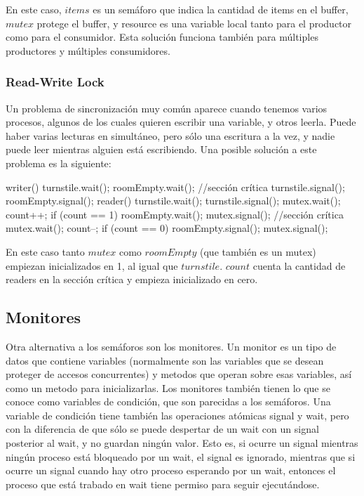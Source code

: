 \documentclass{article}
\begin{document}
En este caso, $items$ es un sem\'aforo que indica la cantidad de items en el buffer, $mutex$ protege el buffer, y resource es una variable local tanto para el productor como para el consumidor. Esta soluci\'on funciona tambi\'en para m\'ultiples productores y m\'ultiples consumidores.

\subsubsection{Read-Write Lock}

Un problema de sincronizaci\'on muy com\'un aparece cuando tenemos varios procesos, algunos de los cuales quieren escribir una variable, y otros leerla. Puede haber varias lecturas en simult\'aneo, pero s\'olo una escritura a la vez, y nadie puede leer mientras alguien est\'a escribiendo. Una posible soluci\'on a este problema es la siguiente:

\begin{code}
writer()
{
    turnstile.wait();
		    roomEmpty.wait();
				//sección crítica
		turnstile.signal();
		roomEmpty.signal();
}
reader()
{
    turnstile.wait();
		turnstile.signal();
		mutex.wait();
		    count++;
				if (count == 1)
				    roomEmpty.wait();
		mutex.signal();
		//sección crítica
		mutex.wait();
		    count--;
				if (count == 0)
				    roomEmpty.signal();
	  mutex.signal();
}
\end{code}

En este caso tanto $mutex$ como $roomEmpty$ (que tambi\'en es un mutex) empiezan inicializados en 1, al igual que $turnstile$. $count$ cuenta la cantidad de readers en la secci\'on cr\'itica y empieza inicializado en cero.

\subsection{Monitores}

Otra alternativa a los sem\'aforos son los monitores. Un monitor es un tipo de datos que contiene variables (normalmente son las variables que se desean proteger de accesos concurrentes) y metodos que operan sobre esas variables, as\'i como un metodo para inicializarlas. Los monitores tambi\'en tienen lo que se conoce como variables de condici\'on, que son parecidas a los sem\'aforos. Una variable de condici\'on tiene tambi\'en las operaciones at\'omicas signal y wait, pero con la diferencia de que s\'olo se puede despertar de un wait con un signal posterior al wait, y no guardan ning\'un valor. Esto es, si ocurre un signal mientras ning\'un proceso est\'a bloqueado por un wait, el signal es ignorado, mientras que si ocurre un signal cuando hay otro proceso esperando por un wait, entonces el proceso que est\'a trabado en wait tiene permiso para seguir ejecut\'andose.
\end{document}
